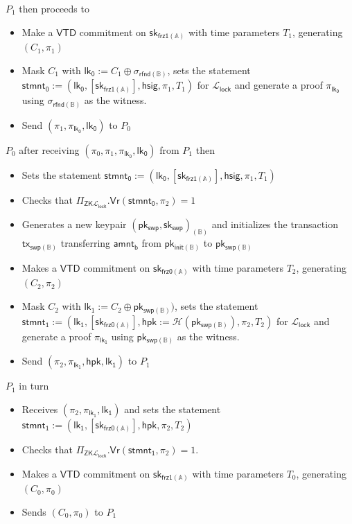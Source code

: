 \documentclass{article}      	%
\begin{document}
$P_1$ then proceeds to
\begin{itemize}
\item Make a $\mathsf{VTD}$ commitment on $\mathsf{sk_{frz1(\mathbb{A})}}$ with time parameters $T_1$, generating $(C_1, \pi_1)$
\item Mask $C_1$ with  $\mathsf{lk_0} := C_1 \oplus \sigma_{\mathsf{rfnd(\mathbb{B})}}$, sets the statement $\mathsf{stmnt_0} := (\mathsf{lk_0}, {[\mathsf{sk_{frz1(\mathbb{A})}}]}, \mathsf{hsig}, \pi_1, T_1)$ for $\mathcal{L}_{\mathsf{lock}}$ and generate a proof $\pi_{\mathsf{lk_0}}$ using $\sigma_{\mathsf{rfnd(\mathbb{B})}}$ as the witness.
\item Send $(\pi_1, \pi_{\mathsf{lk_0}}, \mathsf{lk_0})$ to $P_0$ 
\end{itemize}
\vspace{0.1cm}
$P_0$ after receiving $(\pi_0, \pi_1, \pi_{\mathsf{lk_0}}, \mathsf{lk_0})$ from $P_1$ then
\begin{itemize}
    \item Sets the statement $\mathsf{stmnt_0} := (\mathsf{lk_0}, {[\mathsf{sk_{frz1(\mathbb{A})}}]}, \mathsf{hsig}, \pi_1, T_1)$
    \item Checks that $\Pi_{\mathsf{ZK}\mathcal{L}_{\mathsf{lock}}}.\mathsf{Vr}(\mathsf{stmnt_0}, \pi_2) = 1$
    \item Generates a new keypair $(\mathsf{pk_{swp}}, \mathsf{sk_{swp}})_{(\mathbb{B})}$ and initializes the transaction $\mathsf{tx_{swp(\mathbb{B})}}$ transferring $\mathsf{amnt_b}$ from $\mathsf{pk_{init(\mathbb{B})}}$ to $\mathsf{pk_{swp(\mathbb{B})}}$
    \item Makes a $\mathsf{VTD}$ commitment on $\mathsf{sk_{frz0(\mathbb{A})}}$ with time parameters $T_2$, generating $(C_2, \pi_2)$
    \item Mask $C_2$ with  $\mathsf{lk_1} := C_2 \oplus \mathsf{pk_{swp(\mathbb{B})}})$, sets the statement $\mathsf{stmnt_1} := (\mathsf{lk_1}, {[\mathsf{sk_{frz0(\mathbb{A})}}]}, \mathsf{hpk} := \mathcal{H}(\mathsf{pk_{swp(\mathbb{B})}}), \pi_2, T_2)$ for $\mathcal{L}_{\mathsf{lock}}$ and generate a proof $\pi_{\mathsf{lk_1}}$ using $\mathsf{pk_{swp(\mathbb{B})}}$ as the witness.
    \item Send $(\pi_2, \pi_{\mathsf{lk_1}}, \mathsf{hpk}, \mathsf{lk_1})$ to $P_1$ 
\end{itemize}
$P_1$ in turn
\begin{itemize}
    \item Receives $(\pi_2, \pi_{\mathsf{lk_1}}, \mathsf{lk_1})$ and sets the statement $\mathsf{stmnt_1} := (\mathsf{lk_1}, {[\mathsf{sk_{frz0(\mathbb{A})}}]}, \mathsf{hpk}, \pi_2, T_2)$
    \item Checks that $\Pi_{\mathsf{ZK}\mathcal{L}_{\mathsf{lock}}}.\mathsf{Vr}(\mathsf{stmnt_1}, \pi_2) = 1$. 
    \item Makes a $\mathsf{VTD}$ commitment on $\mathsf{sk_{frz1(\mathbb{A})}}$ with time parameters $T_0$, generating $(C_0, \pi_0)$
    \item Sends $(C_0, \pi_0)$ to $P_1$
\end{itemize}
\end{document}
